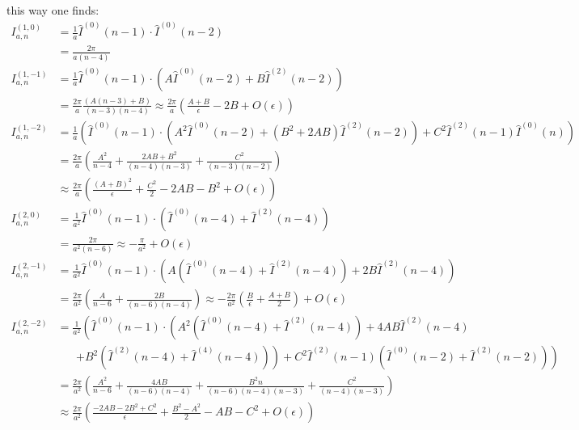 this way one finds\cite[Ch. 5]{Bojak:2000eu}\cite[App. C]{PhysRevD.40.54}:
\begin{align}
I^{(1,0)}_{a,n} &= \frac 1 a\hat I^{(0)}(n-1) \cdot \hat I^{(0)}(n-2)\\
 &= \frac {2\pi}{a(n-4)}\\
I^{(1,-1)}_{a,n} &= \frac 1 a\hat I^{(0)}(n-1)\cdot \left(A\hat I^{(0)}(n-2)+B\hat I^{(2)}(n-2)\right)\\
 &= \frac {2\pi}{a}\frac{(A(n-3)+B)}{(n-3)(n-4)} \approx \frac {2\pi}{a}\left(\frac{A+B}\epsilon - 2B + O(\epsilon)\right)\\
I^{(1,-2)}_{a,n} &= \frac 1 a\left(\hat I^{(0)}(n-1)\cdot \left(A^2\hat I^{(0)}(n-2)+(B^2+2AB)\hat I^{(2)}(n-2)\right) + C^2\hat I^{(2)}(n-1)\hat I^{(0)}(n)\right)\\
 &= \frac {2\pi}{a}\left(\frac {A^2}{n-4} + \frac {2AB + B^2}{(n-4)(n-3)} + \frac {C^2}{(n-3)(n-2)}\right)\\
 &\approx \frac {2\pi}{a}\left(\frac{(A+B)^2}{\epsilon}+\frac{C^2}{2}-2AB-B^2+O(\epsilon)\right)
\end{align}
\begin{align}
I^{(2,0)}_{a,n} &= \frac 1 {a^2}\hat I^{(0)}(n-1) \cdot \left(\hat I^{(0)}(n-4) + \hat I^{(2)}(n-4)\right)\\
 &= \frac {2\pi}{a^2(n-6)} \approx -\frac {\pi}{a^2} + O(\epsilon)\\
I^{(2,-1)}_{a,n} &= \frac 1 {a^2}\hat I^{(0)}(n-1) \cdot \left(A\left(\hat I^{(0)}(n-4) + \hat I^{(2)}(n-4)\right) + 2B\hat I^{(2)}(n-4)\right)\\
 &= \frac {2\pi}{a^2}\left(\frac{A}{n-6}+\frac{2B}{(n-6)(n-4)}\right)\approx -\frac{2\pi}{a^2}\left(\frac{B}{\epsilon} + \frac{A+B} 2\right) + O(\epsilon)\\
I^{(2,-2)}_{a,n} &= \frac 1 {a^2}\left(\hat I^{(0)}(n-1)\cdot \left(A^2(\hat I^{(0)}(n-4)+\hat I^{(2)}(n-4))+4AB\hat I^{(2)}(n-4) \right.\right.\nonumber\\
 &\hspace{20pt}\left.\left. + B^2(\hat I^{(2)}(n-4)+\hat I^{(4)}(n-4))\right) + C^2\hat I^{(2)}(n-1)(\hat I^{(0)}(n-2) + \hat I^{(2)}(n-2))\right)\\
 &= \frac {2\pi}{a^2}\left(\frac {A^2}{n-6}+\frac{4AB}{(n-6)(n-4)} + \frac{B^2 n}{(n-6)(n-4)(n-3)} + \frac{C^2}{(n-4)(n-3)} \right) \\
 &\approx \frac {2\pi}{a^2}\left(\frac{-2AB-2B^2+C^2}{\epsilon}+\frac{B^2-A^2}{2}-AB-C^2+O(\epsilon)\right)\\
\end{align}

